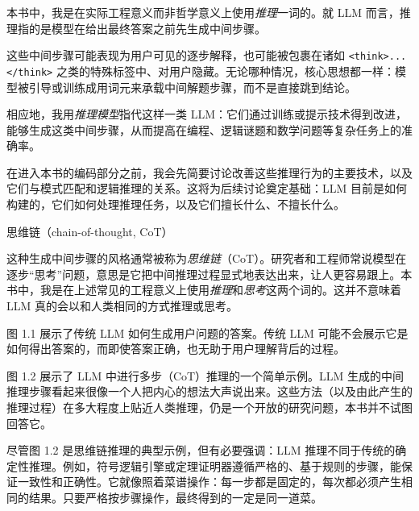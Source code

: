本书中，我是在实际工程意义而非哲学意义上使用\emph{推理}一词的。就 LLM 而言，推理指的是模型在给出最终答案之前先生成中间步骤。

这些中间步骤可能表现为用户可见的逐步解释，也可能被包裹在诸如 \texttt{\textless{}think\textgreater{}...\textless{}/think\textgreater{}} 之类的特殊标签中、对用户隐藏。无论哪种情况，核心思想都一样：模型被引导或训练成用词元来承载中间解题步骤，而不是直接跳到结论。

相应地，我用\emph{推理模型}指代这样一类 LLM：它们通过训练或提示技术得到改进，能够生成这类中间步骤，从而提高在编程、逻辑谜题和数学问题等复杂任务上的准确率。

在进入本书的编码部分之前，我会先简要讨论改善这些推理行为的主要技术，以及它们与模式匹配和逻辑推理的关系。这将为后续讨论奠定基础：LLM 目前是如何构建的，它们如何处理推理任务，以及它们擅长什么、不擅长什么。

\begin{mySidebar}{思维链（chain-of-thought, CoT）}

这种生成中间步骤的风格通常被称为\emph{思维链}（CoT）。研究者和工程师常说模型在逐步“思考”问题，意思是它把中间推理过程显式地表达出来，让人更容易跟上。本书中，我是在上述常见的工程意义上使用\emph{推理}和\emph{思考}这两个词的。这并不意味着 LLM 真的会以和人类相同的方式推理或思考。

\end{mySidebar}

图 1.1 展示了传统 LLM 如何生成用户问题的答案。传统 LLM 可能不会展示它是如何得出答案的，而即使答案正确，也无助于用户理解背后的过程。


图 1.2 展示了 LLM 中进行多步（CoT）推理的一个简单示例。LLM 生成的中间推理步骤看起来很像一个人把内心的想法大声说出来。这些方法（以及由此产生的推理过程）在多大程度上贴近人类推理，仍是一个开放的研究问题，本书并不试图回答它。


尽管图 1.2 是思维链推理的典型示例，但有必要强调：LLM 推理不同于传统的确定性推理。例如，符号逻辑引擎或定理证明器遵循严格的、基于规则的步骤，能保证一致性和正确性。它就像照着菜谱操作：每一步都是固定的，每次都必须产生相同的结果。只要严格按步骤操作，最终得到的一定是同一道菜。

